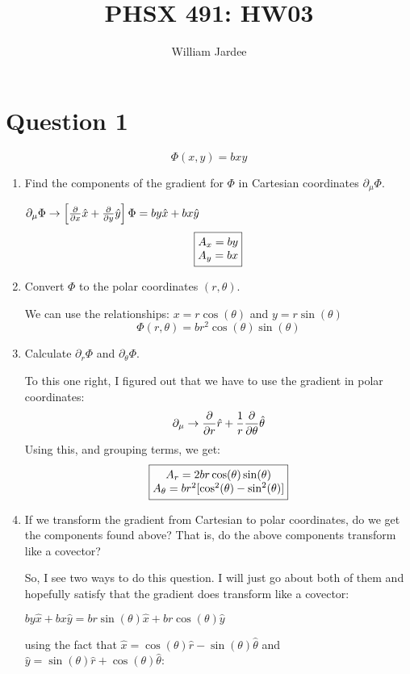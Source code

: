 \documentclass[12pt]{article}
\begin{document}
\title{PHSX 491: HW03}
\author{William Jardee}
\maketitle

\section*{Question 1}

\[\Phi(x,y) = bxy\]

\begin{enumerate}[label=\alph*)]
\item Find the components of the gradient for $\Phi$ in Cartesian coordinates $\partial_\mu \Phi$.

$\partial_\mu \Phi \rightarrow \left[\pdv{x} \hat{x} + \pdv{y}\hat{y}\right] \Phi= by\hat{x} +bx\hat{y}$
\[\boxed{\mqty{A_x = by \\ A_y = bx}}\]

\item Convert $\Phi$ to the polar coordinates $(r,\theta)$.

We can use the relationships: $x = r\cos(\theta)$ and $y = r\sin(\theta)$
\[\boxed{\Phi(r, \theta) = br^2 \cos(\theta)\sin(\theta)}\]

\item Calculate $\partial_r \Phi$ and $\partial_\theta \Phi$.

To this one right, I figured out that we have to use the gradient in polar coordinates:
\[\partial_\mu \rightarrow \pdv{r} \hat{r} + \frac{1}{r}\pdv{\theta}\hat{\theta}\]
Using this, and grouping terms, we get:
\[\boxed{\mqty{A_r = 2br\cos(\theta)\sin(\theta) \\ A_\theta = br^2 [\cos[2](\theta) - \sin[2](\theta)]}}\]

\item If we transform the gradient from Cartesian to polar coordinates, do we get the components found above? That is, do the above components transform like a covector?

So, I see two ways to do this question. I will just go about both of them and hopefully satisfy that the gradient does transform like a covector:

$by \hat{x} + bx \hat{y} = br\sin(\theta)\hat{x} + br\cos(\theta)\hat{y}$

using the fact that $\hat{x} = \cos(\theta)\hat{r} - \sin(\theta)\hat{\theta}$ and $\hat{y} = \sin(\theta)\hat{r} + \cos(\theta)\hat{\theta}$:


\end{enumerate}
\end{document}
